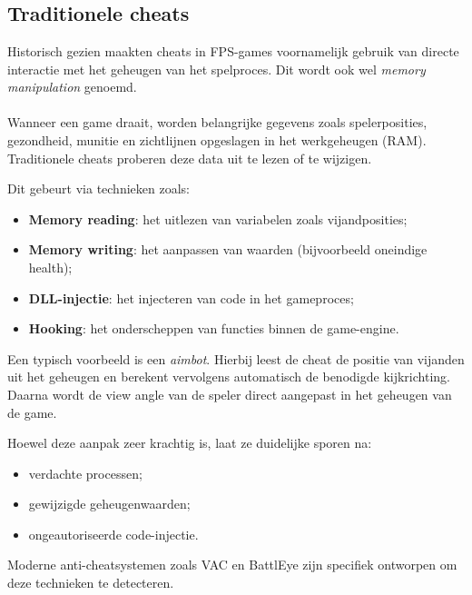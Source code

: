 \chapter{}
\label{ch:AI-gebaseerde-cheats}

\section{Traditionele cheats}

Historisch gezien maakten cheats in FPS-games voornamelijk gebruik van directe interactie met het geheugen van het spelproces. Dit wordt ook wel \textit{memory manipulation} genoemd.
\\\\
Wanneer een game draait, worden belangrijke gegevens zoals spelerposities, gezondheid, munitie en zichtlijnen opgeslagen in het werkgeheugen (RAM). Traditionele cheats proberen deze data uit te lezen of te wijzigen.

Dit gebeurt via technieken zoals:
\begin{itemize}
    \item \textbf{Memory reading}: het uitlezen van variabelen zoals vijandposities;
    \item \textbf{Memory writing}: het aanpassen van waarden (bijvoorbeeld oneindige health);
    \item \textbf{DLL-injectie}: het injecteren van code in het gameproces;
    \item \textbf{Hooking}: het onderscheppen van functies binnen de game-engine.
\end{itemize}

Een typisch voorbeeld is een \textit{aimbot}. Hierbij leest de cheat de positie van vijanden uit het geheugen en berekent vervolgens automatisch de benodigde kijkrichting. Daarna wordt de view angle van de speler direct aangepast in het geheugen van de game.

Hoewel deze aanpak zeer krachtig is, laat ze duidelijke sporen na:
\begin{itemize}
    \item verdachte processen;
    \item gewijzigde geheugenwaarden;
    \item ongeautoriseerde code-injectie.
\end{itemize}

Moderne anti-cheatsystemen zoals VAC en BattlEye zijn specifiek ontworpen om deze technieken te detecteren.

